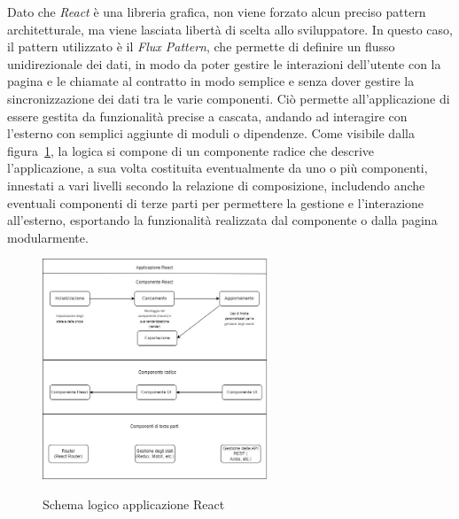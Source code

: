 Dato che \textit{React} è una libreria grafica, non viene forzato alcun preciso pattern architetturale, ma viene lasciata libertà di scelta allo sviluppatore.
In questo caso, il pattern utilizzato è il \textit{Flux Pattern}, che permette di definire un flusso unidirezionale dei dati, in modo da poter gestire
le interazioni dell'utente con la pagina e le chiamate al contratto in modo semplice e senza dover gestire la sincronizzazione dei dati tra le varie componenti.
Ciò permette all'applicazione di essere gestita da funzionalità precise a cascata, andando ad interagire con l'esterno con semplici aggiunte di moduli o dipendenze.
Come visibile dalla figura~\ref{fig:react}, la logica si compone di un componente radice che descrive l'applicazione,
a sua volta costituita eventualmente da uno o più componenti, innestati a vari livelli secondo la relazione di composizione,
includendo anche eventuali componenti di terze parti per permettere la gestione e l'interazione all'esterno, esportando la funzionalità realizzata dal componente
o dalla pagina modularmente. \\

\begin{figure}[ht]
    \centering
    \includegraphics[width=0.6\textwidth, alt={Descrizione dello schema logico di un'applicazione React}]{immagini/react.jpeg}
    \caption{Schema logico applicazione React}\label{fig:react}
\end{figure}

